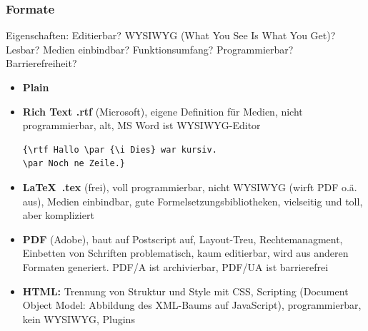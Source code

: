 \documentclass[12pt,landscape]{article}
\begin{document}
\begin{multicols}{3}
\subsubsection{Formate}
Eigenschaften: Editierbar? WYSIWYG (What You See Is What You Get)? Lesbar? Medien einbindbar? Funktionsumfang? Programmierbar? Barrierefreiheit?
\begin{itemize}
\item \textbf{Plain}
\item \textbf{Rich Text .rtf} (Microsoft), eigene Definition für Medien, nicht programmierbar, alt, MS Word ist WYSIWYG-Editor\begin{lstlisting}
{\rtf Hallo \par {\i Dies} war kursiv.
\par Noch ne Zeile.}\end{lstlisting}
\item \textbf{\LaTeX\ .tex} (frei), voll programmierbar, nicht WYSIWYG (wirft PDF o.ä. aus), Medien einbindbar, gute Formelsetzungsbibliotheken, vielseitig und toll, aber kompliziert
\item \textbf{PDF} (Adobe), baut auf Postscript auf, Layout-Treu, Rechtemanagment, Einbetten von Schriften problematisch, kaum editierbar, wird aus anderen Formaten generiert. PDF/A ist archivierbar, PDF/UA ist barrierefrei
\item \textbf{HTML:} Trennung von Struktur und Style mit CSS, Scripting (Document Object Model: Abbildung des XML-Baums auf JavaScript), programmierbar, kein WYSIWYG, Plugins
\end{itemize}

\end{multicols}
\end{document}
